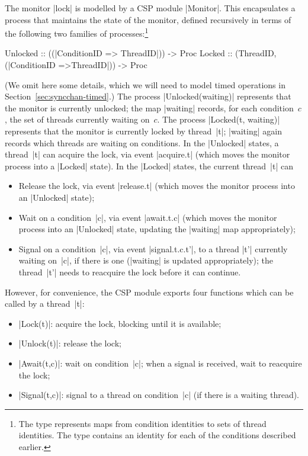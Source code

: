 The monitor |lock| is modelled by a CSP module |Monitor|.  This encapsulates a
process that maintains the state of the monitor, defined recursively in terms
of the following two families of processes:\footnote{%
%
The type  represents maps from condition
identities to sets of thread identities.  The type  contains
an identity for each of the conditions described earlier.}
%
\begin{cspm}
Unlocked :: ((|ConditionID => {ThreadID}|)) -> Proc 
Locked :: (ThreadID, (|ConditionID =>{ThreadID}|)) -> Proc 
\end{cspm}
%
(We omit here some details, which we will need to model timed operations in
Section~\ref{sec:syncchan-timed}.)  The process |Unlocked(waiting)| represents
that the monitor is currently unlocked; the map |waiting| records, for each
condition~$c$, the set of threads currently waiting on~$c$.  The process
|Locked(t, waiting)| represents that the monitor is currently locked by
thread~|t|; |waiting| again records which threads are waiting on conditions.
In the |Unlocked| states, a thread~|t| can acquire the lock, via event
|acquire.t| (which moves the monitor process into a |Locked| state).  In the
|Locked| states, the current thread~|t| can
\begin{itemize}
\item Release the lock, via event |release.t| (which moves the monitor process
  into an |Unlocked| state);
\item Wait on a condition~|c|, via event |await.t.c| (which moves the monitor
  process into an |Unlocked| state, updating the |waiting| map appropriately);
\item Signal on a condition~|c|, via event |signal.t.c.t'|, to a thread |t'|
  currently waiting on~|c|, if there is one (|waiting| is updated
  appropriately); the thread~|t'| needs to reacquire the lock before it can
  continue.
\end{itemize}
%
However, for convenience, the CSP module exports four functions which can be
called by a thread~|t|:
%
\begin{itemize}
\item |Lock(t)|: acquire the lock, blocking until it is available;
\item |Unlock(t)|: release the lock;
\item |Await(t,c)|: wait on condition~|c|; when a signal is received, wait to
  reacquire the lock;
\item |Signal(t,c)|: signal to a thread on condition~|c| (if there is a
  waiting thread). 
\end{itemize}

